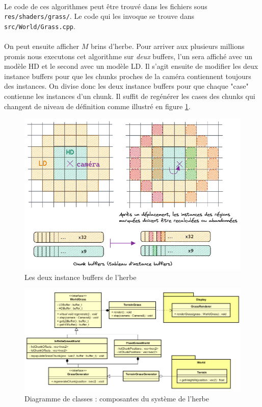 \documentclass{EPUProjetDi}
\newcommand{\code}{\texttt}
\begin{document}
\paragraph{}
Le code de ces algorithmes peut être trouvé dans les fichiers sous \code{res/shaders/grass/}. Le code qui les invoque se trouve dans \code{src/World/Grass.cpp}.

\paragraph{}
On peut ensuite afficher $M$ brins d'herbe. Pour arriver aux plusieurs millions promis nous executons cet algorithme sur \textit{deux} buffers, l'un sera affiché avec un modèle HD et le second avec un modèle LD. Il s'agit ensuite de modifier les deux instance buffers pour que les chunks proches de la caméra contiennent toujours des instances. On divise donc les deux instance buffers pour que chaque "case" contienne les instances d'un chunk. Il suffit de regénérer les cases des chunks qui changent de niveau de définition comme illustré en figure \ref{fig:grass_instance_buffers}.

\begin{figure}[ht]
	\centering
	\includegraphics[scale=.49]{grass_instance_buffers}
	\caption{Les deux instance buffers de l'herbe}
	\label{fig:grass_instance_buffers}
\end{figure}

\begin{figure}[ht]
	\centering
	\includegraphics[scale=.49]{grass_uml}
	\caption{Diagramme de classes : composantes du système de l'herbe}
\end{figure}
\end{document}
